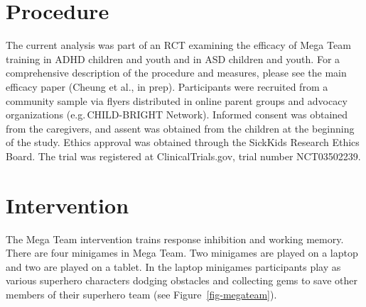 \documentclass[
  letterpaper,
]{ut-thesis}
\begin{document}
\section{Procedure}\label{procedure}

The current analysis was part of an RCT examining the efficacy of Mega
Team training in ADHD children and youth and in ASD children and youth.
For a comprehensive description of the procedure and measures, please
see the main efficacy paper (Cheung et al., in prep). Participants were
recruited from a community sample via flyers distributed in online
parent groups and advocacy organizations (e.g.\,CHILD-BRIGHT Network).
Informed consent was obtained from the caregivers, and assent was
obtained from the children at the beginning of the study. Ethics
approval was obtained through the SickKids Research Ethics Board. The
trial was registered at ClinicalTrials.gov, trial number NCT03502239.

\section{Intervention}\label{intervention}

The Mega Team intervention trains response inhibition and working
memory. There are four minigames in Mega Team. Two minigames are played
on a laptop and two are played on a tablet. In the laptop minigames
participants play as various superhero characters dodging obstacles and
collecting gems to save other members of their superhero team (see
Figure~\ref{fig-megateam}).
\end{document}
